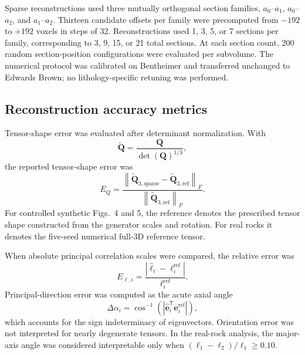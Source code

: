 \documentclass{article}
\begin{document}
Sparse reconstructions used three mutually orthogonal section families,
$a_0$--$a_1$, $a_0$--$a_2$, and $a_1$--$a_2$. Thirteen candidate offsets
per family were precomputed from $-192$ to $+192$ voxels in steps of 32.
Reconstructions used 1, 3, 5, or 7 sections per family, corresponding to
3, 9, 15, or 21 total sections. At each section count, 200 random
section-position configurations were evaluated per subvolume. The numerical
protocol was calibrated on Bentheimer and transferred unchanged to Edwards
Brown; no lithology-specific retuning was performed.

\subsection{Reconstruction accuracy metrics}
\label{subsec:accuracy_metrics}

Tensor-shape error was evaluated after determinant normalization. With
\begin{equation}
    \widetilde{\bm{Q}}
    =
    \frac{\bm{Q}}{\det(\bm{Q})^{1/3}},
\end{equation}
the reported tensor-shape error was
\begin{equation}
    E_{Q}
    =
    \frac{
        \left\|
            \widetilde{\bm{Q}}_{3,\mathrm{sparse}}
            -
            \widetilde{\bm{Q}}_{3,\mathrm{ref}}
        \right\|_{F}
    }{
        \left\|
            \widetilde{\bm{Q}}_{3,\mathrm{ref}}
        \right\|_{F}
    }.
    \label{eq:tensor_error}
\end{equation}
For controlled synthetic Figs.~4 and 5, the reference denotes the prescribed
tensor shape constructed from the generator scales and rotation. For real rocks
it denotes the five-seed numerical full-3D reference tensor.

When absolute principal correlation scales were compared, the relative error
was
\begin{equation}
    E_{\ell,i}
    =
    \frac{
        |\widehat{\ell}_{i}-\ell_{i}^{\mathrm{ref}}|
    }{
        \ell_{i}^{\mathrm{ref}}
    }.
    \label{eq:length_error}
\end{equation}
Principal-direction error was computed as the acute axial angle
\begin{equation}
    \Delta\alpha_{i}
    =
    \cos^{-1}
    \left(
        \left|
        \widehat{\bm{e}}_{i}^{\mathsf T}        \bm{e}_{i}^{\mathrm{ref}}
        \right|
    \right),
    \label{eq:orientation_error}
\end{equation}
which accounts for the sign indeterminacy of eigenvectors. Orientation error
was not interpreted for nearly degenerate tensors. In the real-rock analysis,
the major-axis angle was considered interpretable only when
$(\ell_1-\ell_2)/\ell_1\geq0.10$.
\end{document}

